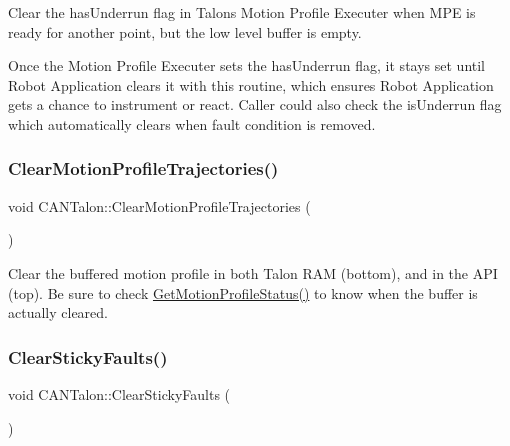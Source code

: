 Clear the has\+Underrun flag in Talon\textquotesingle{}s Motion Profile Executer when M\+PE is ready for another point, but the low level buffer is empty.

Once the Motion Profile Executer sets the has\+Underrun flag, it stays set until Robot Application clears it with this routine, which ensures Robot Application gets a chance to instrument or react. Caller could also check the is\+Underrun flag which automatically clears when fault condition is removed. \mbox{\label{class_c_a_n_talon_accccf75c371c510174a91b350d57135c}} 
\subsubsection{\texorpdfstring{Clear\+Motion\+Profile\+Trajectories()}{ClearMotionProfileTrajectories()}}
{\footnotesize\ttfamily void C\+A\+N\+Talon\+::\+Clear\+Motion\+Profile\+Trajectories (\begin{DoxyParamCaption}{ }\end{DoxyParamCaption})}

Clear the buffered motion profile in both Talon R\+AM (bottom), and in the A\+PI (top). Be sure to check \hyperlink{class_c_a_n_talon_a67e151009a27f9ce3317fc040fb85d2a}{Get\+Motion\+Profile\+Status()} to know when the buffer is actually cleared. \mbox{\label{class_c_a_n_talon_ab4a9db0ef97b04adb93d2e200a9b9573}} 
\subsubsection{\texorpdfstring{Clear\+Sticky\+Faults()}{ClearStickyFaults()}}
{\footnotesize\ttfamily void C\+A\+N\+Talon\+::\+Clear\+Sticky\+Faults (\begin{DoxyParamCaption}{ }\end{DoxyParamCaption})}

\mbox{\label{class_c_a_n_talon_ad7dce04cbc276a76ca6ea8048da13908}} 
